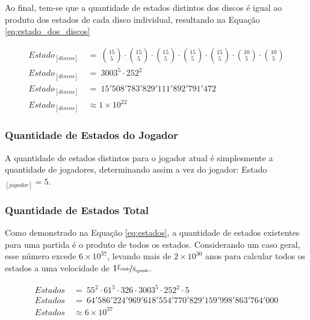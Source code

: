 Ao final, tem-se que a quantidade de estados distintos dos discos é igual ao produto dos estados de cada disco individual, resultando na Equação \ref{eq:estado_dos_discos}

\begin{equation} \label{eq:estado_dos_discos} \tag{e.q. Estado dos discos}
\begin{split}
	Estado_{[discos]}\ &=\ \binom{15}{5}\cdot\binom{15}{5}\cdot\binom{15}{5}\cdot\binom{15}{5}\cdot\binom{15}{5}\cdot\binom{10}{5}\cdot\binom{10}{5}\\
	Estado_{[discos]}\ &=\ 3003^5\cdot252^2\\
	Estado_{[discos]}\ &=\ 15'508'783'829'111'892'791'472\\
	Estado_{[discos]}\ &\approx 1\times 10^{22}
\end{split}
\end{equation}

\subsubsection{Quantidade de Estados do Jogador}

A quantidade de estados distintos para o jogador atual é simplesmente a quantidade de jogadores, determinando assim a vez do jogador: Estado$_{[jogador]}=5$.

\subsubsection{Quantidade de Estados Total}

Como demonstrado na Equação \ref{eq:estados}, a quantidade de estados existentes para uma partida é o produto de todos os estados. Considerando um caso geral, esse número excede $6\times 10^{37}$, levando mais de $2\times 10^{30}$ anos para calcular todos os estados a uma velocidade de $1 \nicefrac{E_{stado}}{S_{egundo}}$.

\begin{equation} \label{eq:estados} \tag{e.q. Caso Geral}
\begin{split}
	Estados\ &=\ 55^{2}\cdot61^{5}\cdot326\cdot3003^{5}\cdot252^{2}\cdot5\\
	Estados\ &=\ 64'586'224'969'618'554'770'829'159'998'863'764'000\\
	Estados\ &\approx 6\times 10^{37}
\end{split}
\end{equation}

